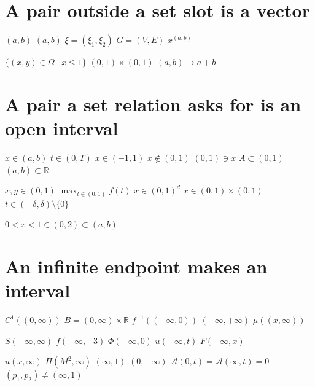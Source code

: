 \documentclass{article}
\begin{document}
\section{A pair outside a set slot is a vector}
$(a,b)$ $\left(a,b\right)$ $\xi=(\xi_1,\xi_2)$ $G=(V,E)$ $x^{(a,b)}$

$\{(x,y)\in\Omega\mid x\leq 1\}$ $(0,1)\times(0,1)$ $(a,b)\mapsto a+b$

\section{A pair a set relation asks for is an open interval}
$x\in(a,b)$ $t\in(0,T)$ $x\in(-1,1)$ $x\notin(0,1)$ $(0,1)\ni x$ $A\subset(0,1)$ $(a,b)\subset\mathbb{R}$

$x,y\in(0,1)$ $\max_{t\in(0,1)}f(t)$ $x\in(0,1)^d$ $x\in(0,1)\times(0,1)$ $t\in(-\delta,\delta)\setminus\{0\}$

$0<x<1\in(0,2)\subset(a,b)$

\section{An infinite endpoint makes an interval}
$C^1((0,\infty))$ $B=(0,\infty)\times\mathbb{R}$ $f^{-1}((-\infty,0))$ $(-\infty,+\infty)$ $\mu((x,\infty))$

$S(-\infty,\infty)$ $f(-\infty,-3)$ $\Phi(-\infty,0)$ $u(-\infty,t)$ $F(-\infty,x)$

$u(x,\infty)$ $\Pi(M^2,\infty)$ $(\infty,1)$ $(0,-\infty)$
$\mathcal{A}(0,t)=\mathcal{A}(\infty,t)=0$ $(p_{1},p_{2})\neq(\infty,1)$
\end{document}
